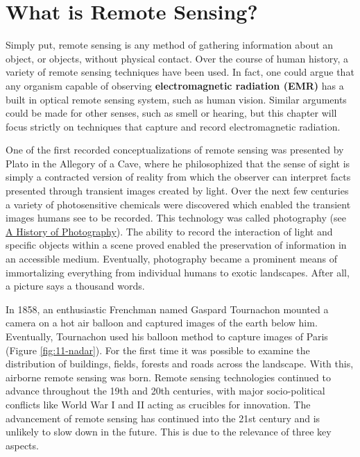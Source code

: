 \documentclass[
]{book}
\begin{document}
\hypertarget{what-is-remote-sensing}{%
\section{What is Remote Sensing?}\label{what-is-remote-sensing}}

Simply put, remote sensing is any method of gathering information about
an object, or objects, without physical contact. Over the course of
human history, a variety of remote sensing techniques have been used. In
fact, one could argue that any organism capable of observing
\textbf{electromagnetic radiation (EMR)} has a built in optical remote sensing
system, such as human vision. Similar arguments could be made for other
senses, such as smell or hearing, but this chapter will focus strictly
on techniques that capture and record electromagnetic radiation.

One of the first recorded conceptualizations of remote sensing was
presented by Plato in the Allegory of a Cave, where he philosophized
that the sense of sight is simply a contracted version of reality from
which the observer can interpret facts presented through transient
images created by light. Over the next few centuries a variety of
photosensitive chemicals were discovered which enabled the transient
images humans see to be recorded. This technology was called
photography (see \href{https://www.scienceandmediamuseum.org.uk/objects-and-stories/history-photography}{A History of
Photography}).
The ability to record the interaction of light and specific objects
within a scene proved enabled the preservation of information in an
accessible medium. Eventually, photography became a prominent means of
immortalizing everything from individual humans to exotic landscapes.
After all, a picture says a thousand words.

In 1858, an enthusiastic Frenchman named Gaspard Tournachon mounted a
camera on a hot air balloon and captured images of the earth below him.
Eventually, Tournachon used his balloon method to capture images of
Paris (Figure \ref{fig:11-nadar}). For the first time it was possible
to examine the distribution of buildings, fields, forests and roads
across the landscape. With this, airborne remote sensing was born.
Remote sensing technologies continued to advance throughout the 19th and
20th centuries, with major socio-political conflicts like World War I
and II acting as crucibles for innovation. The advancement of remote
sensing has continued into the 21st century and is unlikely to slow down
in the future. This is due to the relevance of three key aspects.
\end{document}
